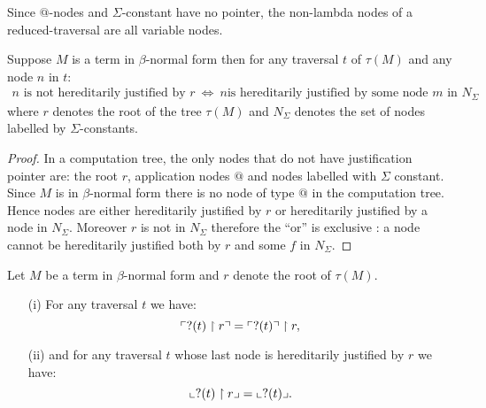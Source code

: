 Since $@$-nodes and $\Sigma$-constant have no pointer, the non-lambda nodes of a reduced-traversal
are all variable nodes.


\begin{property}
\label{proper:betaeta_trav}
Suppose $M$ is a term in $\beta$-normal form then
for any traversal $t$ of $\tau(M)$ and any node $n$ in $t$:
\begin{eqnarray*}
n \mbox{ is not hereditarily justified by } r  \  \iff \   n \mbox{
is hereditarily justified by some node $m$ in } N_\Sigma
\end{eqnarray*}
where $r$ denotes the root of the tree
$\tau(M)$ and $N_\Sigma$ denotes the set of nodes labelled by $\Sigma$-constants.
\end{property}
\begin{proof}
In a computation tree, the only nodes that do not have justification pointer are:
the root $r$, application nodes $@$ and nodes labelled with $\Sigma$ constant.
Since $M$ is in $\beta$-normal form there is no node of type $@$ in the computation tree.
Hence nodes are either hereditarily justified by $r$ or
hereditarily justified  by a node in $N_\Sigma$. Moreover $r$ is not in
$N_\Sigma$ therefore the ``or'' is exclusive : a node cannot be hereditarily justified both by $r$ and some $f$ in $N_\Sigma$.
\end{proof}

\begin{lem}
\label{lem:redtrav_trav} Let $M$ be a term in $\beta$-normal form and
$r$ denote the root of $\tau(M)$.
\begin{itemize}
\item[(i)] For any traversal $t$ we have:
$$ \ulcorner ?(t) \upharpoonright  r  \urcorner = \ulcorner ?(t) \urcorner \upharpoonright r ,$$
\item[(ii)] and for any traversal $t$ whose last node is hereditarily justified by
$r$ we have:
    $$ \llcorner ?(t) \upharpoonright r  \lrcorner = \llcorner ?(t) \lrcorner.$$
\end{itemize}
\end{lem}

